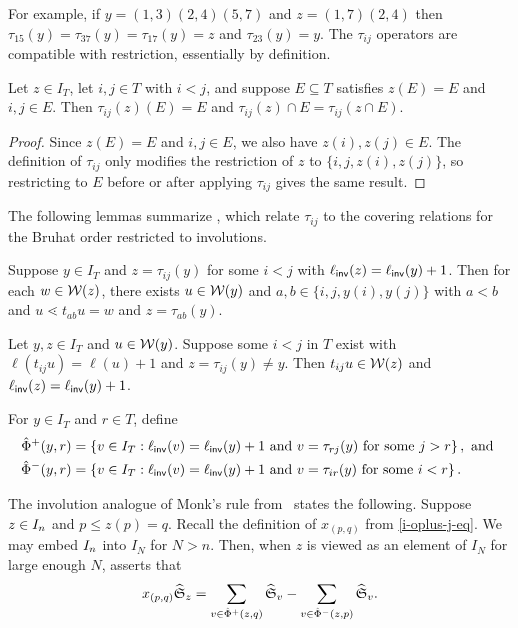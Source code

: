 \documentclass[10pt]{article}
\begin{document}
For example,
if $y=(1,3)(2,4)(5,7)$ and $z=(1,7)(2,4)$
 then $\tau_{15}(y)=\tau_{37}(y)=\tau_{17}(y)=z$ and $\tau_{23}(y)=y$.
The $\tau_{ij}$ operators are compatible with restriction, essentially by definition.


\begin{lemma}
\label{L: tau and pattern}
Let $z\in I_T$, let $i,j\in T$ with $i<j$,
and suppose $E\subseteq T$ satisfies $z(E)=E$
and $i,j\in E$.
Then $\tau_{ij}(z)(E)=E$ and
$\tau_{ij}(z)\cap E
=
\tau_{ij}(z\cap E)$.
\end{lemma}

\begin{proof}
Since $z(E)=E$ and $i,j\in E$,
we also have $z(i),z(j)\in E$.
The definition of $\tau_{ij}$ only modifies
the restriction of $z$ to
$\{i,j,z(i),z(j)\}$, so restricting to $E$ before or after
applying $\tau_{ij}$ gives the same result.
\end{proof}

The following lemmas summarize \cite[Cor.~3.5 and Thms.~3.16 and 3.20]{HMP3}, which relate $\tau_{ij}$
to the covering relations for the Bruhat order restricted to involutions.

\begin{lemma}
\label{L: involution cover atoms}
Suppose $y\in I_T$ and
$z=\tau_{ij}(y)$ for some $i<j$ with
$\ell_{\mathsf{inv}}(z)=\ell_{\mathsf{inv}}(y)+1$.
Then for each $w\in\mathcal{W}(z)$,
there exists $u\in\mathcal{W}(y)$ and $a,b\in \{i,j,y(i),y(j)\}$ with $a<b$ and 
$u\lessdot t_{ab}u=w$ and $z=\tau_{ab}(y)$.
\end{lemma}

\begin{lemma}
\label{L: atom cover transition---missing}
Let  $y,z\in I_T$ and $u \in \mathcal{W}(y)$. Suppose some $i<j$ in $T$ exist with $\ell(t_{ij}u)=\ell(u)+1$ and $z=\tau_{ij}(y)\neq y$.
Then $t_{ij}u \in \mathcal{W}(z)$ and $\ell_{\mathsf{inv}}(z)=\ell_{\mathsf{inv}}(y)+1$.
\end{lemma}

 

For $y\in I_T$ and $r\in T$, define
\begin{align*}
\hat\Phi^{+}(y,r)
 & =
\left\{
v\in I_T:
\ell_{\mathsf{inv}}(v)=\ell_{\mathsf{inv}}(y)+1
\text{ and }
v =\tau_{rj}(y)
\text{ for some }j>r
\right\}, \text{ and } \\
\hat\Phi^{-}(y,r)
& =
\left\{
v\in I_T:
\ell_{\mathsf{inv}}(v)=\ell_{\mathsf{inv}}(y)+1
\text{ and }
v=\tau_{ir}(y)
\text{ for some }i<r
\right\}.
\end{align*}

The involution analogue of Monk's rule
from~\cite{HMP3} states the following.
Suppose $z\in I_n$ and $p\leq z(p)=q$.
Recall the definition of $x_{(p,q)}$ from \eqref{i-oplus-j-eq}.
We may embed $I_n$ into $I_{N}$
for $N > n$. 
Then, when $z$ is viewed as an element 
of $I_N$ for large enough $N$,
 \cite[Thm.~1.5]{HMP3} asserts that
\begin{equation}
\label{EQ: HMP}
x_{(p,q)}\widehat{\mathfrak S}_z
=
\sum_{v\in\hat\Phi^{+}(z,q)}
\widehat{\mathfrak S}_v
-
\sum_{v\in\hat\Phi^{-}(z,p)}
\widehat{\mathfrak S}_v.
\end{equation}
\end{document}
